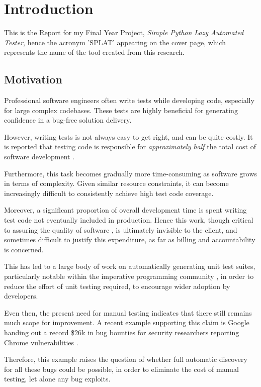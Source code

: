 \chapter{Introduction}
This is the Report for my Final Year Project, \emph{Simple Python Lazy Automated Tester}, hence the acronym '\textsf{SPLAT}' appearing on the cover page, which represents the name of the tool created from this research.
\section{Motivation}	%
Professional software engineers often write tests while developing code, especially for large complex codebases. These tests are highly beneficial for generating confidence in a bug-free solution delivery.

However, writing tests is not always easy to get right, and can be quite costly. It is reported that testing code is responsible for \emph{approximately half} the total cost of software development \cite{Edvardsson99asurvey}\cite{Han2008}\cite{Korel2005}.

Furthermore, this task becomes gradually more time-consuming as software grows in terms of complexity. Given similar resource constraints, it can become increasingly difficult to consistently achieve high test code coverage.

Moreover, a significant proportion of overall development time is spent writing test code not eventually included in production. Hence this work, though critical to assuring the quality of software \cite{Harrold00}, is ultimately invisible to the client, and sometimes difficult to justify this expenditure, as far as billing and accountability is concerned.

This has led to a large body of work on automatically generating unit test suites, particularly notable within the imperative programming community \cite{Allwood2011}, in order to reduce the effort of unit testing required, to encourage wider adoption by developers.

Even then, the present need for manual testing indicates that there still remains much scope for improvement. A recent example supporting this claim is Google handing out a record \$26k in bug bounties for security researchers reporting Chrome vulnerabilities \cite{ChromeBugBounties}.

Therefore, this example raises the question of whether full automatic discovery \cite{Bertolino2007} for all these bugs could be possible, in order to eliminate the cost of manual testing, let alone any bug exploits.
